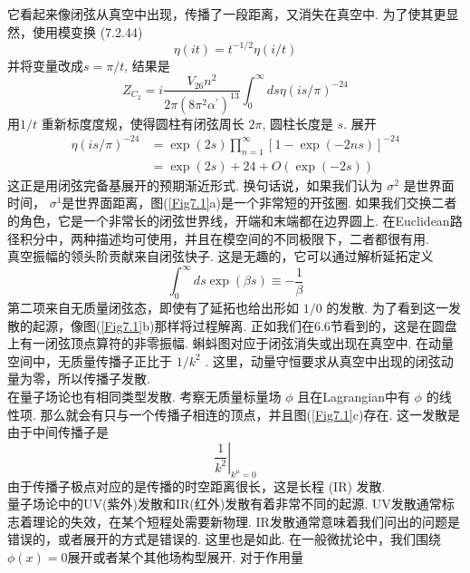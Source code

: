 它看起来像闭弦从真空中出现，传播了一段距离，又消失在真空中. 为了使其更显然，使用模变换 (7.2.44)
\begin{equation}
	\eta(i t)=t^{-1 / 2} \eta(i / t)
\end{equation}
并将变量改成$s=\pi / t$, 结果是
\begin{equation}
	Z_{C_{2}}=i \frac{V_{26} n^{2}}{2 \pi\left(8 \pi^{2} \alpha^{\prime}\right)^{13}} \int_{0}^{\infty} d s \eta(i s / \pi)^{-24}
\end{equation}
用$1 / t$ 重新标度度规，使得圆柱有闭弦周长 $2 \pi$, 圆柱长度是 $s $. 展开
\begin{equation}
	\begin{aligned}
		\eta(i s / \pi)^{-24} &=\exp (2 s) \prod_{n=1}^{\infty}[1-\exp (-2 n s)]^{-24} \\
		&=\exp (2 s)+24+O(\exp (-2 s))
	\end{aligned}
\end{equation}
这正是用闭弦完备基展开的预期渐近形式. 换句话说，如果我们认为 $\sigma^{2}$ 是世界面时间， $\sigma^{1}$是世界面距离，图(\ref{Fig7.1}a)是一个非常短的开弦圈. 如果我们交换二者的角色，它是一个非常长的闭弦世界线，开端和末端都在边界圆上. 在Euclidean路径积分中，两种描述均可使用，并且在模空间的不同极限下，二者都很有用.\\
真空振幅的领头阶贡献来自闭弦快子. 这是无趣的，它可以通过解析延拓定义
\begin{equation}
	\int_{0}^{\infty} d s \exp (\beta s) \equiv-\frac{1}{\beta}
\end{equation}
第二项来自无质量闭弦态，即使有了延拓也给出形如 $1 / 0$ 的发散. 为了看到这一发散的起源，像图(\ref{Fig7.1}b)那样将过程解离. 正如我们在6.6节看到的，这是在圆盘上有一闭弦顶点算符的非零振幅. 蝌蚪图对应于闭弦消失或出现在真空中. 在动量空间中，无质量传播子正比于 $1 / k^{2} $ . 这里，动量守恒要求从真空中出现的闭弦动量为零，所以传播子发散.\\
在量子场论也有相同类型发散. 考察无质量标量场 $\phi$ 且在Lagrangian中有 $\phi$ 的线性项. 那么就会有只与一个传播子相连的顶点，并且图(\ref{Fig7.1}c)存在. 这一发散是由于中间传播子是
\begin{equation}
	\left.\frac{1}{k^{2}}\right|_{k^{\mu}=0}
\end{equation}
由于传播子极点对应的是传播的时空距离很长，这是长程 (IR) 发散.\\
量子场论中的UV(紫外)发散和IR(红外)发散有着非常不同的起源. UV发散通常标志着理论的失效，在某个短程处需要新物理. IR发散通常意味着我们问出的问题是错误的，或者展开的方式是错误的. 这里也是如此. 在一般微扰论中，我们围绕 $\phi(x)=0$展开或者某个其他场构型展开. 对于作用量
